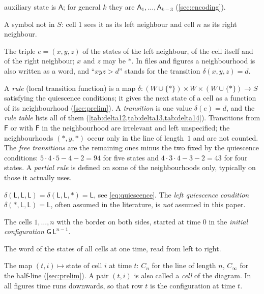 {\begin{description}[style=unboxed,leftmargin=1em,font=\normalfont\bfseries,itemsep=1pt,parsep=0pt,topsep=2pt]
  auxiliary state is $\mathsf A$; for general $k$ they are $\mathsf
  A_1,\dots,\mathsf A_{k-3}$ (\cref{sec:encoding}).
\item[Border $\ast$.] A symbol not in $S$: cell $1$ sees it as its left
  neighbour and cell $n$ as its right neighbour.
\item[Neighbourhood.] The triple $e=(x,y,z)$ of the states of the left
  neighbour, of the cell itself and of the right neighbour; $x$ and $z$
  may be $\ast$. In files and figures a neighbourhood is also written as
  a word, and ``$xyz{>}d$'' stands for the transition $\delta(x,y,z)=d$.
\item[Rule $\delta$; transition; rule table.] A \emph{rule} (local
  transition function) is a map
  $\delta:(W\cup\{\ast\})\times W\times(W\cup\{\ast\})\to S$ satisfying
  the quiescence conditions; it gives the next state of a cell as a
  function of its neighbourhood (\cref{sec:prelim}). A \emph{transition} is
  one value $\delta(e)=d$, and the \emph{rule table} lists all of them
  (\cref{tab:delta12,tab:delta13,tab:delta14}). Transitions from
  $\mathsf F$ or with $\mathsf F$ in the neighbourhood are irrelevant and
  left unspecified; the neighbourhoods $(\ast,y,\ast)$ occur only in the
  line of length~$1$ and are not counted. The \emph{free transitions} are
  the remaining ones minus the two fixed by the quiescence conditions:
  $5\cdot4\cdot5-4-2=94$ for five states and $4\cdot3\cdot4-3-2=43$ for
  four states. A \emph{partial rule} is defined on some of the
  neighbourhoods only, typically on those it actually uses.
\item[Quiescence conditions.] $\delta(\mathsf L,\mathsf L,\mathsf
  L)=\delta(\mathsf L,\mathsf L,\ast)=\mathsf L$, see
  \eqref{eq:quiescence}. The \emph{left quiescence condition}
  $\delta(\ast,\mathsf L,\mathsf L)=\mathsf L$, often assumed in the
  literature, is \emph{not} assumed in this paper.
\item[Line of length $n$.] The cells $1,\dots,n$ with the border on both
  sides, started at time $0$ in the \emph{initial configuration}
  $\mathsf G\,\mathsf L^{n-1}$.
\item[Configuration.] The word of the states of all cells at one time,
  read from left to right.
\item[Space-time diagram.] The map $(t,i)\mapsto{}$state of cell $i$ at
  time $t$: $C_n$ for the line of length $n$, $C_\infty$ for the
  half-line (\cref{sec:prelim}). A pair $(t,i)$ is also called a
  \emph{cell} of the diagram. In all figures time runs downwards, so that
  row $t$ is the configuration at time $t$.

\end{description}}
